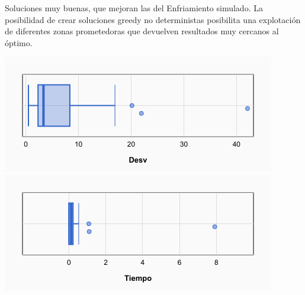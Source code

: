 \documentclass[a4paper, 12pt]{article}
\begin{document}
	Soluciones muy buenas, que mejoran las del Enfriamiento simulado. La posibilidad de crear soluciones greedy no deterministas posibilita una explotación de diferentes zonas prometedoras que devuelven resultados muy cercanos al óptimo. 

	\begin{center}
         \includegraphics[scale=0.5]{desv-grasp}
         \includegraphics[scale=0.5]{time-grasp}
      \end{center}
      
      \newpage
\end{document}
